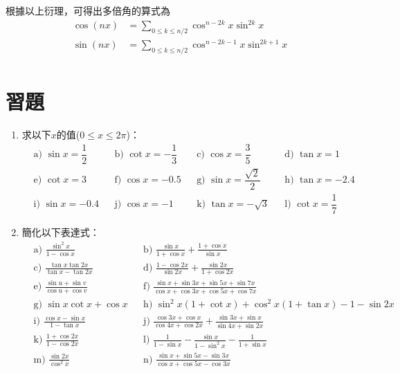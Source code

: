 \documentclass[12pt]{article}
\begin{document}
    根據以上衍理，可得出多倍角的算式為\begin{align*}
        \cos(nx)&=\sum_{0\leq k\leq n/2}\cos^{n-2k}{x}\sin^{2k}{x}\\
        \sin(nx)&=\sum_{0\leq k\leq n/2}\cos^{n-2k-1}{x}\sin^{2k+1}{x}\\
    \end{align*}

    \section*{習題}
    \begin{enumerate}
        \item 求以下$x$的值($0\leq x \leq 2\pi$)：\begin{align*}
            &\textrm{a) } \sin{x}=\dfrac{1}{2} && \textrm{b) } \cot{x}=-\dfrac{1}{3} && \textrm{c) } \cos{x}=\dfrac{3}{5} && \textrm{d) } \tan{x}=1\\
            &\textrm{e) } \cot{x}=3 && \textrm{f) } \cos{x}=-0.5 && \textrm{g) } \sin{x}=\dfrac{\sqrt{2}}{2} && \textrm{h) } \tan{x}=-2.4\\
            &\textrm{i) } \sin{x}=-0.4 && \textrm{j) } \cos{x}=-1 && \textrm{k) } \tan{x}=-\sqrt{3} && \textrm{l) } \cot{x}=\dfrac{1}{7}
        \end{align*}
        \item 簡化以下表達式：\begin{align*}
            &\textrm{a) } \frac{\sin^2{x}}{1-\cos{x}} && \textrm{b) } \frac{\sin{x}}{1+\cos{x}}+\frac{1+\cos{x}}{\sin{x}}\\
            &\textrm{c) } \frac{\tan{x}\tan{2x}}{\tan{x}-\tan{2x}} && \textrm{d) } \frac{1-\cos{2x}}{\sin{2x}}+\frac{\sin{2x}}{1+\cos{2x}}\\
            &\textrm{e) } \frac{\sin{u}+\sin{v}}{\cos{u}+\cos{v}} && \textrm{f) } \frac{\sin{x}+\sin{3x}+\sin{5x}+\sin{7x}}{\cos{x}+\cos{3x}+\cos{5x}+\cos{7x}}\\
            &\textrm{g) } \sin{x}\cot{x}+\cos{x} && \textrm{h) } \sin^2{x}(1+\cot{x})+\cos^2{x}(1+\tan{x})-1-\sin{2x}\\
            &\textrm{i) } \frac{\cos{x}-\sin{x}}{1-\tan{x}} && \textrm{j) } \frac{\cos{3x}+\cos{x}}{\cos{4x}+\cos{2x}}+\frac{\sin{3x}+\sin{x}}{\sin{4x}+\sin{2x}}\\
            &\textrm{k) } \frac{1+\cos{2x}}{1-\cos{2x}} && \textrm{l) } \frac{1}{1-\sin{x}}-\frac{\sin{x}}{1-\sin^2{x}}-\frac{1}{1+\sin{x}}\\
            &\textrm{m) } \frac{\sin{2x}}{\cos^2{x}} && \textrm{n) } \frac{\sin{x}+\sin{5x}-\sin{3x}}{\cos{x}+\cos{5x}-\cos{3x}}\\

\end{align*}
\end{enumerate}
\end{document}
